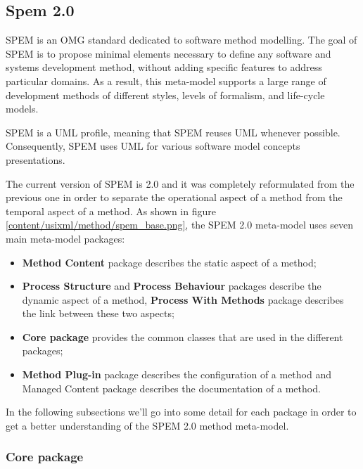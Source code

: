 \subsection{Spem 2.0}
\label{subsection:spem2}

SPEM is an OMG standard dedicated to software method modelling. The goal of SPEM is to propose minimal elements necessary to define any software and systems development method, without adding specific features to address particular domains. As a result, this meta-model supports a large range of development methods of different styles, levels of formalism, and life-cycle models.

SPEM is a UML profile, meaning that SPEM reuses UML whenever possible. Consequently, SPEM uses UML for various software model concepts presentations.

The current version of SPEM is 2.0 and it was completely reformulated from the previous one in order to separate the operational aspect of a method from the temporal aspect of a method. As shown in figure \ref{content/usixml/method/spem_base.png}, the SPEM 2.0 meta-model uses seven main meta-model packages:
\begin{itemize}
\item \textbf{Method Content} package describes the static aspect of a method; 
\item \textbf{Process Structure} and \textbf{Process Behaviour} packages describe the dynamic aspect of a method, \textbf{Process With Methods} package describes the link between these two aspects; 
\item \textbf{Core package} provides the common classes that are used in the different packages; \item \textbf{Method Plug-in} package describes the configuration of a method and Managed Content package describes the documentation of a method.
\end{itemize}


In the following subsections we'll go into some detail for each package in order to get a better understanding of the SPEM 2.0 method meta-model.

\subsubsection{Core package}

